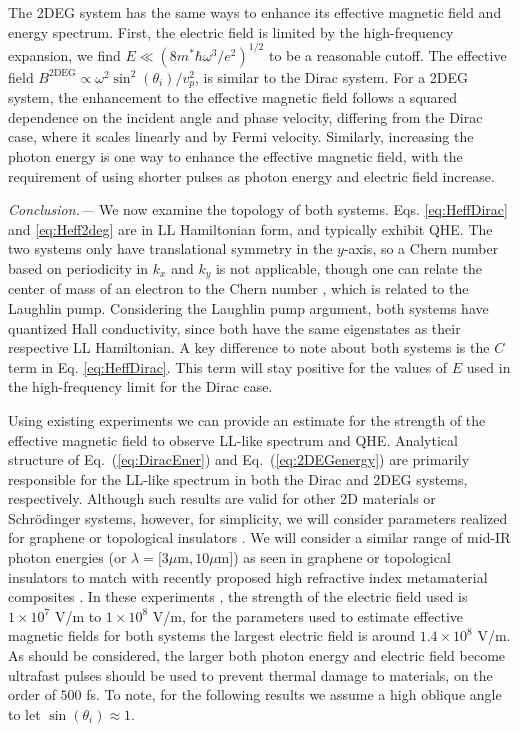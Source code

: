 \documentclass[aps,prb,twocolumn,showpacs,superscriptaddress]{revtex4-2}
\begin{document}
The 2DEG system has the same ways to enhance its effective magnetic field and energy spectrum.
First, the electric field is limited by the high-frequency expansion, we find $E \ll (8m^*\hbar\omega^3/e^2)^{1/2}$ to be a reasonable cutoff.
The effective field $B^{\text{2DEG}} \propto \omega^2 \sin^2{(\theta_i)} / v_p^2$, is similar to the Dirac system.
For a 2DEG system, the enhancement to the effective magnetic field follows a squared dependence on the incident angle and phase velocity, differing from the Dirac case, where it scales linearly and by Fermi velocity.
Similarly, increasing the photon energy is one way to enhance the effective magnetic field, with the requirement of using shorter pulses as photon energy and electric field increase.

\emph{Conclusion.---} We now examine the topology of both systems.
Eqs. \eqref{eq:HeffDirac} and \eqref{eq:Heff2deg} are in LL Hamiltonian form, and typically exhibit QHE.
The two systems only have translational symmetry in the $y$-axis, so a Chern number based on periodicity in $k_x$ and $k_y$ is not applicable, though one can relate the center of mass of an electron to the Chern number \cite{supp}, which is related to the Laughlin pump.
Considering the Laughlin pump argument, both systems have quantized Hall conductivity, since both have the same eigenstates as their respective LL Hamiltonian.
A key difference to note about both systems is the $C$ term in Eq. \eqref{eq:HeffDirac}.
This term will stay positive for the values of $E$ used in the high-frequency limit for the Dirac case.

Using existing experiments \cite{YHW, JWM} we can provide an estimate for the strength of the effective magnetic field to observe LL-like spectrum and QHE.
Analytical structure of Eq.~(\ref{eq:DiracEner}) and Eq.~(\ref{eq:2DEGenergy}) are primarily responsible for the LL-like spectrum in both the Dirac and 2DEG systems, respectively.
Although such results are valid for other 2D materials or Schr\"{o}dinger systems, however, for simplicity, we will consider parameters realized for graphene or topological insulators \cite{YHW, JWM}.
We will consider a similar range of mid-IR photon energies (or $\lambda = [3\mu $m$ , 10\mu $m$]$) as seen in graphene or topological insulators \cite{YHW, JWM} to match with recently proposed high refractive index metamaterial composites \cite{shimFundamentalLimitsRefractive2021}.
In these experiments \cite{YHW, JWM}, the strength of the electric field used is $1 \times 10^7$ V/m to $1 \times 10^8$ V/m, for the parameters used to estimate effective magnetic fields for both systems the largest electric field is around $1.4 \times 10^8$ V/m.
As should be considered, the larger both photon energy and electric field become ultrafast pulses should be used to prevent thermal damage to materials, on the order of $500$ fs.
To note, for the following results we assume a high oblique angle to let $\sin{(\theta_i)} \approx 1$.
\end{document}
